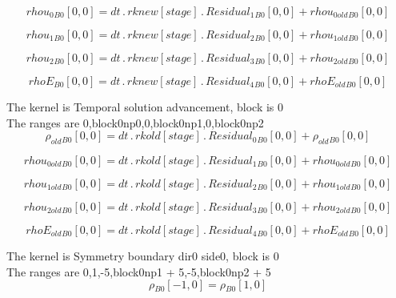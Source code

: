 \documentclass{article}
\begin{document}
\begin{dmath}{rhou_{0}{_{B0}}}[{0,0}] = dt \,.\, {rknew}[{stage}] \,.\, {Residual_{1}{_{B0}}}[{0,0}] + {rhou_{0 old}{_{B0}}}[{0,0}]\end{dmath}

\begin{dmath}{rhou_{1}{_{B0}}}[{0,0}] = dt \,.\, {rknew}[{stage}] \,.\, {Residual_{2}{_{B0}}}[{0,0}] + {rhou_{1 old}{_{B0}}}[{0,0}]\end{dmath}

\begin{dmath}{rhou_{2}{_{B0}}}[{0,0}] = dt \,.\, {rknew}[{stage}] \,.\, {Residual_{3}{_{B0}}}[{0,0}] + {rhou_{2 old}{_{B0}}}[{0,0}]\end{dmath}

\begin{dmath}{rhoE{_{B0}}}[{0,0}] = dt \,.\, {rknew}[{stage}] \,.\, {Residual_{4}{_{B0}}}[{0,0}] + {rhoE_{old}{_{B0}}}[{0,0}]\end{dmath}

\noindent The kernel is Temporal solution advancement, block is 0\\\noindent The ranges are 0,block0np0,0,block0np1,0,block0np2\\\begin{dmath}{\rho_{old}{_{B0}}}[{0,0}] = dt \,.\, {rkold}[{stage}] \,.\, {Residual_{0}{_{B0}}}[{0,0}] + {\rho_{old}{_{B0}}}[{0,0}]\end{dmath}

\begin{dmath}{rhou_{0 old}{_{B0}}}[{0,0}] = dt \,.\, {rkold}[{stage}] \,.\, {Residual_{1}{_{B0}}}[{0,0}] + {rhou_{0 old}{_{B0}}}[{0,0}]\end{dmath}

\begin{dmath}{rhou_{1 old}{_{B0}}}[{0,0}] = dt \,.\, {rkold}[{stage}] \,.\, {Residual_{2}{_{B0}}}[{0,0}] + {rhou_{1 old}{_{B0}}}[{0,0}]\end{dmath}

\begin{dmath}{rhou_{2 old}{_{B0}}}[{0,0}] = dt \,.\, {rkold}[{stage}] \,.\, {Residual_{3}{_{B0}}}[{0,0}] + {rhou_{2 old}{_{B0}}}[{0,0}]\end{dmath}

\begin{dmath}{rhoE_{old}{_{B0}}}[{0,0}] = dt \,.\, {rkold}[{stage}] \,.\, {Residual_{4}{_{B0}}}[{0,0}] + {rhoE_{old}{_{B0}}}[{0,0}]\end{dmath}

\noindent The kernel is Symmetry boundary dir0 side0, block is 0\\\noindent The ranges are 0,1,-5,block0np1 + 5,-5,block0np2 + 5\\\begin{dmath}{\rho{_{B0}}}[{-1,0}] = {\rho{_{B0}}}[{1,0}]\end{dmath}
\end{document}
